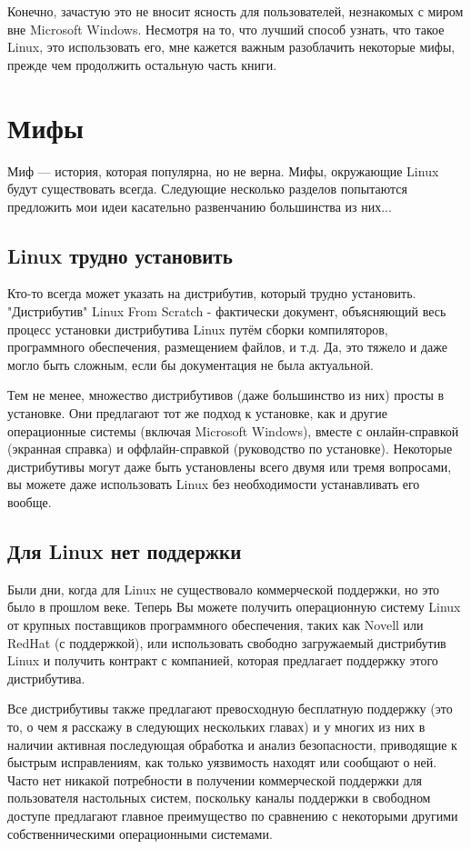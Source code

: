 \documentclass[12pt]{book}
\begin{document}
Конечно, зачастую это не вносит ясность для пользователей, незнакомых с миром вне Microsoft Windows. Несмотря на то, что лучший способ узнать, что такое Linux, это использовать его, мне кажется важным разоблачить некоторые мифы, прежде чем продолжить остальную часть книги.

\section*{Мифы}

Миф — история, которая популярна, но не верна.  Мифы, окружающие Linux будут существовать всегда. Следующие несколько разделов попытаются предложить мои идеи касательно развенчанию большинства из них...

\subsection{Linux трудно установить}

Кто-то всегда может указать на дистрибутив, который трудно установить. "Дистрибутив" Linux From Scratch - фактически документ, объясняющий весь процесс установки дистрибутива Linux путём сборки компиляторов, программного обеспечения, размещением файлов, и т.д. Да, это тяжело и даже могло быть сложным, если бы документация не была актуальной.

Тем не менее, множество дистрибутивов (даже большинство из них) просты в установке. Они предлагают тот же подход к установке, как и другие операционные системы (включая Microsoft Windows), вместе с онлайн-справкой (экранная справка) и оффлайн-справкой (руководство по установке). Некоторые дистрибутивы могут даже быть установлены всего двумя или тремя вопросами, вы можете даже использовать Linux без необходимости  устанавливать его вообще.

\subsection{Для Linux нет поддержки }

Были дни, когда для Linux не существовало коммерческой поддержки, но это было в прошлом веке. Теперь Вы можете получить операционную систему Linux от крупных поставщиков программного обеспечения, таких как Novell или RedHat (с поддержкой), или использовать свободно загружаемый дистрибутив Linux и получить контракт с компанией, которая предлагает поддержку этого дистрибутива.

Все дистрибутивы также предлагают превосходную бесплатную поддержку (это то, о чем я расскажу в следующих нескольких главах) и у многих из них в наличии активная последующая обработка и анализ безопасности, приводящие к быстрым исправлениям, как только уязвимость находят или сообщают о ней. Часто нет никакой потребности в получении коммерческой поддержки для пользователя настольных систем, поскольку каналы поддержки в свободном доступе предлагают главное преимущество по сравнению с некоторыми другими собственническими операционными системами.
\end{document}
